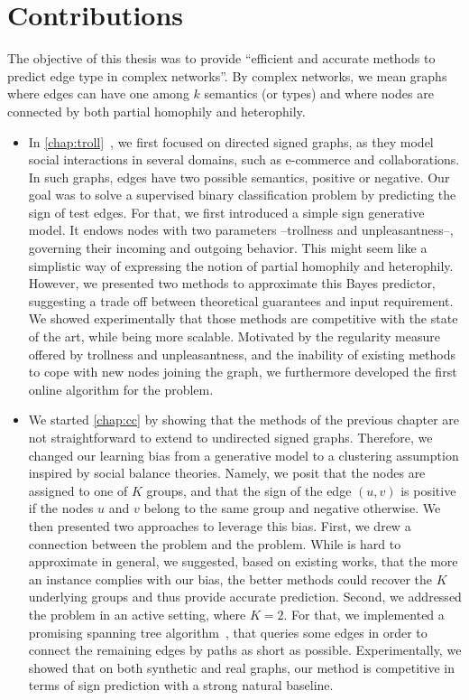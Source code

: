 \label{chap:conclusion}

\section{Contributions}

The objective of this thesis was to provide \enquote{efficient and accurate methods to predict edge
type in complex networks}. By complex networks, we mean graphs where edges can have one among $k$
semantics (or types) and where nodes are connected by both partial homophily and heterophily. 

\begin{itemize}

  \item In \autoref{chap:troll}~\autocite{trollSign17}, we first focused on directed signed graphs,
    as they model social interactions in several domains, such as e-commerce and collaborations.
    In such graphs, edges have two possible semantics, positive or negative. Our goal was to solve a supervised
    binary classification problem by predicting the sign of test edges. For that, we first
    introduced a simple sign generative model. It endows nodes with two parameters --trollness and
    unpleasantness--, governing their incoming and outgoing behavior. This might seem like a
    simplistic way of expressing the notion of partial homophily and heterophily. However, we
    presented two methods to approximate this Bayes predictor, suggesting a trade off between
    theoretical guarantees and input requirement. We showed experimentally that those methods are
    competitive with the state of the art, while being more scalable. Motivated by the regularity
    measure offered by trollness and unpleasantness, and the inability of existing methods to cope
    with new nodes joining the graph, we furthermore developed the first online algorithm for the
    \esp{} problem.

  \item We started \autoref{chap:cc} by showing that the methods of the previous chapter are not
    straightforward to extend to undirected signed graphs. Therefore, we changed our learning bias
    from a generative model to a clustering assumption inspired by social balance theories. Namely,
    we posit that the nodes are assigned to one of $K$ groups, and that the sign of the edge $(u,v)$
    is positive if the nodes $u$ and $v$ belong to the same group and negative otherwise. We then
    presented two approaches to leverage this bias. First, we drew a connection between the \esp{}
    problem and the \pcc{} problem. While \pcc{} is hard to approximate in general, we suggested,
    based on existing works, that the more an instance complies with our bias, the better \pcc{}
    methods could recover the $K$ underlying groups and thus provide accurate prediction. Second, we
    addressed the problem in an active setting, where $K=2$. For that, we implemented a promising
    spanning tree algorithm~\autocite{gtxFabio}, that queries some edges in order to connect the
    remaining edges by paths as short as possible. Experimentally, we showed that on both synthetic
    and real graphs, our method is competitive in terms of sign prediction with a strong natural
    baseline.


\end{itemize}
